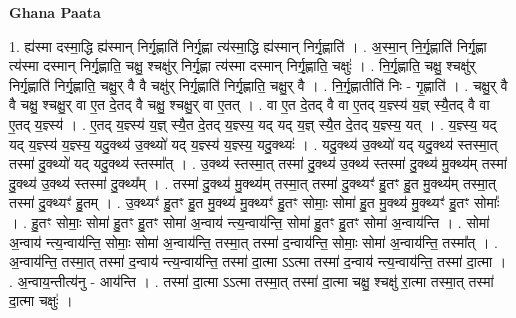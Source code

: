 \documentclass[17pt]{extarticle}
\begin{document}
\textbf{Ghana Paata } \newline

1. ह्य॑स्मा दस्मा॒द्धि ह्य॑स्मान् निर्गृ॒ह्णाति॑ निर्गृ॒ह्णा त्य॑स्मा॒द्धि ह्य॑स्मान् निर्गृ॒ह्णाति॑ । . अ॒स्मा॒न् नि॒र्गृ॒ह्णाति॑ निर्गृ॒ह्णा त्य॑स्मा दस्मान् निर्गृ॒ह्णाति॒ चक्षु॒ श्चक्षु॑र् निर्गृ॒ह्णा त्य॑स्मा दस्मान् निर्गृ॒ह्णाति॒ चक्षुः॑ । . नि॒र्गृ॒ह्णाति॒ चक्षु॒ श्चक्षु॑र् निर्गृ॒ह्णाति॑ निर्गृ॒ह्णाति॒ चक्षु॒र् वै वै चक्षु॑र् निर्गृ॒ह्णाति॑ निर्गृ॒ह्णाति॒ चक्षु॒र् वै । . नि॒र्गृ॒ह्णातीति॑ निः - गृ॒ह्णाति॑ । . चक्षु॒र् वै वै चक्षु॒ श्चक्षु॒र् वा ए॒त दे॒तद् वै चक्षु॒ श्चक्षु॒र् वा ए॒तत् । . वा ए॒त दे॒तद् वै वा ए॒तद् य॒ज्ञ्स्य॑ य॒ज्ञ् स्यै॒तद् वै वा ए॒तद् य॒ज्ञ्स्य॑ । . ए॒तद् य॒ज्ञ्स्य॑ य॒ज्ञ् स्यै॒त दे॒तद् य॒ज्ञ्स्य॒ यद् यद् य॒ज्ञ् स्यै॒त दे॒तद् य॒ज्ञ्स्य॒ यत् । . य॒ज्ञ्स्य॒ यद् यद् य॒ज्ञ्स्य॑ य॒ज्ञ्स्य॒ यदु॒क्थ्य॑ उ॒क्थ्यो॑ यद् य॒ज्ञ्स्य॑ य॒ज्ञ्स्य॒ यदु॒क्थ्यः॑ । . यदु॒क्थ्य॑ उ॒क्थ्यो॑ यद् यदु॒क्थ्य॑ स्तस्मा॒त् तस्मा॑ दु॒क्थ्यो॑ यद् यदु॒क्थ्य॑ स्तस्मा᳚त् । . उ॒क्थ्य॑ स्तस्मा॒त् तस्मा॑ दु॒क्थ्य॑ उ॒क्थ्य॑ स्तस्मा॑ दु॒क्थ्य॑ मु॒क्थ्य॑म् तस्मा॑ दु॒क्थ्य॑ उ॒क्थ्य॑ स्तस्मा॑ दु॒क्थ्य᳚म् । . तस्मा॑ दु॒क्थ्य॑ मु॒क्थ्य॑म् तस्मा॒त् तस्मा॑ दु॒क्थ्यꣳ॑ हु॒तꣳ हु॒त मु॒क्थ्य॑म् तस्मा॒त् तस्मा॑ दु॒क्थ्यꣳ॑ हु॒तम् । . उ॒क्थ्यꣳ॑ हु॒तꣳ हु॒त मु॒क्थ्य॑ मु॒क्थ्यꣳ॑ हु॒तꣳ सोमाः॒ सोमा॑ हु॒त मु॒क्थ्य॑ मु॒क्थ्यꣳ॑ हु॒तꣳ सोमाः᳚ । . हु॒तꣳ सोमाः॒ सोमा॑ हु॒तꣳ हु॒तꣳ सोमा॑ अ॒न्वाय॑ न्त्य॒न्वाय॑न्ति॒ सोमा॑ हु॒तꣳ हु॒तꣳ सोमा॑ अ॒न्वाय॑न्ति । . सोमा॑ अ॒न्वाय॑ न्त्य॒न्वाय॑न्ति॒ सोमाः॒ सोमा॑ अ॒न्वाय॑न्ति॒ तस्मा॒त् तस्मा॑ द॒न्वाय॑न्ति॒ सोमाः॒ सोमा॑ अ॒न्वाय॑न्ति॒ तस्मा᳚त् । . अ॒न्वाय॑न्ति॒ तस्मा॒त् तस्मा॑ द॒न्वाय॑ न्त्य॒न्वाय॑न्ति॒ तस्मा॑ दा॒त्मा ऽऽत्मा तस्मा॑ द॒न्वाय॑ न्त्य॒न्वाय॑न्ति॒ तस्मा॑ दा॒त्मा । . अ॒न्वाय॒न्तीत्य॑नु - आय॑न्ति । . तस्मा॑ दा॒त्मा ऽऽत्मा तस्मा॒त् तस्मा॑ दा॒त्मा चक्षु॒ श्चक्षु॑ रा॒त्मा तस्मा॒त् तस्मा॑ दा॒त्मा चक्षुः॑ । \newline
\end{document}
